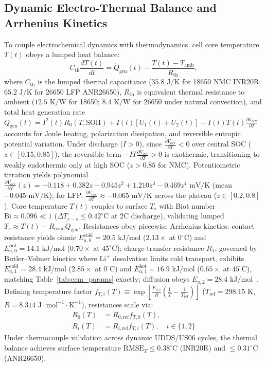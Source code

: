\documentclass[balance,nocopyright,upint,varvw,hyphenate,barcolor=NavyBlue,nolists]{asmejour}
\begin{document}
\subsection{Dynamic Electro-Thermal Balance and Arrhenius Kinetics}
To couple electrochemical dynamics with thermodynamics, cell core temperature $T(t)$ obeys a lumped heat balance:
\begin{equation}\label{eqn:thermal_balance}
C_{\text{th}} \frac{d T(t)}{dt} = \dot{Q}_{\text{gen}}(t) - \frac{T(t) - T_{\text{amb}}}{R_{\text{th}}},
\end{equation}
where $C_{\text{th}}$ is the lumped thermal capacitance ($35.8\text{ J/K}$ for 18650 NMC INR20R; $65.2\text{ J/K}$ for 26650 LFP ANR26650), $R_{\text{th}}$ is equivalent thermal resistance to ambient ($12.5\text{ K/W}$ for 18650; $8.4\text{ K/W}$ for 26650 under natural convection), and total heat generation rate $\dot{Q}_{\text{gen}}(t) = I^2(t) R_0(T, \text{SOH}) + I(t)[U_1(t) + U_2(t)] - I(t) T(t) \frac{\partial V_{\text{ocv}}}{\partial T}$ accounts for Joule heating, polarization dissipation, and reversible entropic potential variation. Under discharge ($I > 0$), since $\frac{\partial V_{\text{ocv}}}{\partial T} < 0$ over central SOC ($z \in [0.15, 0.85]$), the reversible term $-I T \frac{\partial V_{\text{ocv}}}{\partial T} > 0$ is exothermic, transitioning to weakly endothermic only at high SOC ($z > 0.85$ for NMC). Potentiometric titration yields polynomial $\frac{\partial V_{\text{ocv}}}{\partial T}(z) = -0.118 + 0.382 z - 0.945 z^2 + 1.210 z^3 - 0.469 z^4\text{ mV/K}$ (mean $-0.045\text{ mV/K}$); for LFP, $\frac{\partial V_{\text{ocv}}}{\partial T} \approx -0.065\text{ mV/K}$ across the plateau ($z \in [0.2, 0.8]$). Core temperature $T(t)$ couples to surface $T_s$ with Biot number $\text{Bi} \approx 0.096 \ll 1$ ($\Delta T_{c-s} \le 0.42^\circ\text{C}$ at 2C discharge), validating lumped $T_s \approx T(t) - R_{\text{cond}}\dot{Q}_{\text{gen}}$. Resistances obey piecewise Arrhenius kinetics: contact resistance yields ohmic $E_{a,0}^{\text{cold}} = 20.5\text{ kJ/mol}$ ($2.13\times$ at $0^\circ\text{C}$) and $E_{a,0}^{\text{hot}} = 14.1\text{ kJ/mol}$ ($0.70\times$ at $45^\circ\text{C}$); charge-transfer resistance $R_1$, governed by Butler--Volmer kinetics where $\text{Li}^+$ desolvation limits cold transport, exhibits $E_{a,1}^{\text{cold}} = 28.4\text{ kJ/mol}$ ($2.85\times$ at $0^\circ\text{C}$) and $E_{a,1}^{\text{hot}} = 16.9\text{ kJ/mol}$ ($0.65\times$ at $45^\circ\text{C}$), matching Table~\ref{tab:ecm_params} exactly; diffusion obeys $E_{a,2} = 28.4\text{ kJ/mol}$~\cite{He2011ecm,Ren2019aging}. Defining temperature factor $f_{T,i}(T) \equiv \exp[\frac{E_{a,i}}{R}(\frac{1}{T} - \frac{1}{T_{\text{ref}}})]$ ($T_{\text{ref}} = 298.15\text{ K}$, $R = 8.314\text{ J}\cdot\text{mol}^{-1}\cdot\text{K}^{-1}$), resistances scale via:
\begin{align}
R_0(T) &= R_{0,\text{ref}} f_{T,0}(T), \label{eqn:arrh_r0}\\
R_i(T) &= R_{i,\text{ref}} f_{T,i}(T), \quad i \in \{1, 2\} \label{eqn:arrh_ri}
\end{align}
Under thermocouple validation across dynamic UDDS/US06 cycles, the thermal balance achieves surface temperature $\text{RMSE}_T \le 0.38^\circ\text{C}$ (INR20R) and $\le 0.31^\circ\text{C}$ (ANR26650).
\end{document}
